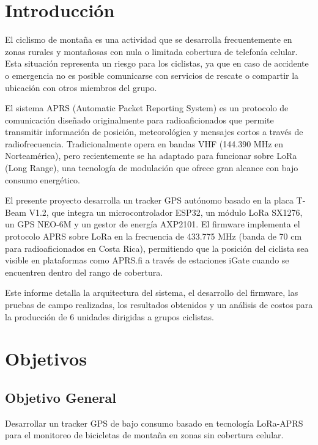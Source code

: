 \documentclass[conference]{IEEEtran}
\begin{document}
\section{Introducción}

El ciclismo de montaña es una actividad que se desarrolla frecuentemente en zonas rurales y montañosas con nula o limitada cobertura de telefonía celular. Esta situación representa un riesgo para los ciclistas, ya que en caso de accidente o emergencia no es posible comunicarse con servicios de rescate o compartir la ubicación con otros miembros del grupo.

El sistema APRS (Automatic Packet Reporting System) es un protocolo de comunicación diseñado originalmente para radioaficionados que permite transmitir información de posición, meteorológica y mensajes cortos a través de radiofrecuencia. Tradicionalmente opera en bandas VHF (144.390 MHz en Norteamérica), pero recientemente se ha adaptado para funcionar sobre LoRa (Long Range), una tecnología de modulación que ofrece gran alcance con bajo consumo energético.

El presente proyecto desarrolla un tracker GPS autónomo basado en la placa T-Beam V1.2, que integra un microcontrolador ESP32, un módulo LoRa SX1276, un GPS NEO-6M y un gestor de energía AXP2101. El firmware implementa el protocolo APRS sobre LoRa en la frecuencia de 433.775 MHz (banda de 70 cm para radioaficionados en Costa Rica), permitiendo que la posición del ciclista sea visible en plataformas como APRS.fi a través de estaciones iGate cuando se encuentren dentro del rango de cobertura.

Este informe detalla la arquitectura del sistema, el desarrollo del firmware, las pruebas de campo realizadas, los resultados obtenidos y un análisis de costos para la producción de 6 unidades dirigidas a grupos ciclistas.

\section{Objetivos}

\subsection{Objetivo General}
Desarrollar un tracker GPS de bajo consumo basado en tecnología LoRa-APRS para el monitoreo de bicicletas de montaña en zonas sin cobertura celular.
\end{document}
